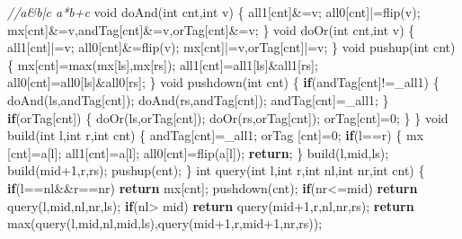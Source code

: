 \documentclass[
]{article}
\newenvironment{Shaded}{}{}
\newcommand{\CommentTok}[1]{\textcolor[rgb]{0.38,0.63,0.69}{\textit{#1}}}
\newcommand{\ControlFlowTok}[1]{\textcolor[rgb]{0.00,0.44,0.13}{\textbf{#1}}}
\newcommand{\DataTypeTok}[1]{\textcolor[rgb]{0.56,0.13,0.00}{#1}}
\newcommand{\DecValTok}[1]{\textcolor[rgb]{0.25,0.63,0.44}{#1}}
\newcommand{\NormalTok}[1]{#1}
\begin{document}
\begin{Shaded}
\begin{Highlighting}[]
\CommentTok{//a\&b|c a*b+c}
\DataTypeTok{void}\NormalTok{ doAnd(}\DataTypeTok{int}\NormalTok{ cnt,}\DataTypeTok{int}\NormalTok{ v)}
\NormalTok{\{}
\NormalTok{    all1[cnt]\&=v;}
\NormalTok{    all0[cnt]|=flip(v);}
\NormalTok{    mx[cnt]\&=v,andTag[cnt]\&=v,orTag[cnt]\&=v;}
\NormalTok{\}}
\DataTypeTok{void}\NormalTok{ doOr(}\DataTypeTok{int}\NormalTok{ cnt,}\DataTypeTok{int}\NormalTok{ v)}
\NormalTok{\{}
\NormalTok{    all1[cnt]|=v;}
\NormalTok{    all0[cnt]\&=flip(v);}
\NormalTok{    mx[cnt]|=v,orTag[cnt]|=v;}
\NormalTok{\}}
\DataTypeTok{void}\NormalTok{ pushup(}\DataTypeTok{int}\NormalTok{ cnt)}
\NormalTok{\{}
\NormalTok{    mx[cnt]=max(mx[ls],mx[rs]);}
\NormalTok{    all1[cnt]=all1[ls]\&all1[rs];}
\NormalTok{    all0[cnt]=all0[ls]\&all0[rs];}
\NormalTok{\}}
\DataTypeTok{void}\NormalTok{ pushdown(}\DataTypeTok{int}\NormalTok{ cnt)}
\NormalTok{\{}
    \ControlFlowTok{if}\NormalTok{(andTag[cnt]!=\_all1)}
\NormalTok{    \{}
\NormalTok{        doAnd(ls,andTag[cnt]);}
\NormalTok{        doAnd(rs,andTag[cnt]);}
\NormalTok{        andTag[cnt]=\_all1;}
\NormalTok{    \}}
    \ControlFlowTok{if}\NormalTok{(orTag[cnt])}
\NormalTok{    \{}
\NormalTok{        doOr(ls,orTag[cnt]);}
\NormalTok{        doOr(rs,orTag[cnt]);}
\NormalTok{        orTag[cnt]=}\DecValTok{0}\NormalTok{;}
\NormalTok{    \}}
\NormalTok{\}}
\DataTypeTok{void}\NormalTok{ build(}\DataTypeTok{int}\NormalTok{ l,}\DataTypeTok{int}\NormalTok{ r,}\DataTypeTok{int}\NormalTok{ cnt)}
\NormalTok{\{}
\NormalTok{    andTag[cnt]=\_all1;}
\NormalTok{    orTag [cnt]=}\DecValTok{0}\NormalTok{;}
    \ControlFlowTok{if}\NormalTok{(l==r)}
\NormalTok{    \{}
\NormalTok{        mx  [cnt]=a[l];}
\NormalTok{        all1[cnt]=a[l];}
\NormalTok{        all0[cnt]=flip(a[l]);}
        \ControlFlowTok{return}\NormalTok{;}
\NormalTok{    \}}
\NormalTok{    build(l,mid,ls);}
\NormalTok{    build(mid+}\DecValTok{1}\NormalTok{,r,rs);}
\NormalTok{    pushup(cnt);}
\NormalTok{\}}
\DataTypeTok{int}\NormalTok{ query(}\DataTypeTok{int}\NormalTok{ l,}\DataTypeTok{int}\NormalTok{ r,}\DataTypeTok{int}\NormalTok{ nl,}\DataTypeTok{int}\NormalTok{ nr,}\DataTypeTok{int}\NormalTok{ cnt)}
\NormalTok{\{}
    \ControlFlowTok{if}\NormalTok{(l==nl\&\&r==nr) }\ControlFlowTok{return}\NormalTok{ mx[cnt];}
\NormalTok{    pushdown(cnt);}
    \ControlFlowTok{if}\NormalTok{(nr\textless{}=mid) }\ControlFlowTok{return}\NormalTok{ query(l,mid,nl,nr,ls);}
    \ControlFlowTok{if}\NormalTok{(nl\textgreater{} mid) }\ControlFlowTok{return}\NormalTok{ query(mid+}\DecValTok{1}\NormalTok{,r,nl,nr,rs);}
    \ControlFlowTok{return}\NormalTok{ max(query(l,mid,nl,mid,ls),query(mid+}\DecValTok{1}\NormalTok{,r,mid+}\DecValTok{1}\NormalTok{,nr,rs));}

\end{Highlighting}
\end{Shaded}
\end{document}
